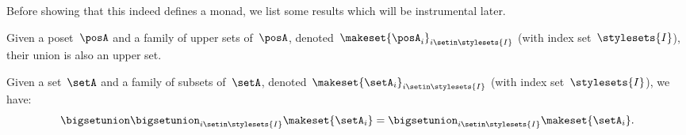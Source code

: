 Before showing that this indeed defines a monad, we list some results which will be instrumental later.
\begin{lemma}
    \label{lem:upperunionupper}
    Given a poset~$\posA$ and a family of upper sets of~$\posA$, denoted~$\makeset{\posA_i}_{i\setin \stylesets{I}}$ (with index set~$\stylesets{I}$), their union is also an upper set.
\end{lemma}

\begin{lemma}
    \label{lem:setunionset}
    Given a set~$\setA$ and a family of subsets of~$\setA$, denoted~$\makeset{\setA_i}_{i\setin \stylesets{I}}$ (with index set~$\stylesets{I}$), we have:
    \begin{equation}
        \bigsetunion \bigsetunion_{i\setin \stylesets{I}}\makeset{\setA_i} = \bigsetunion_{i\setin \stylesets{I}}\makeset{\setA_i}.
    \end{equation}
\end{lemma}

